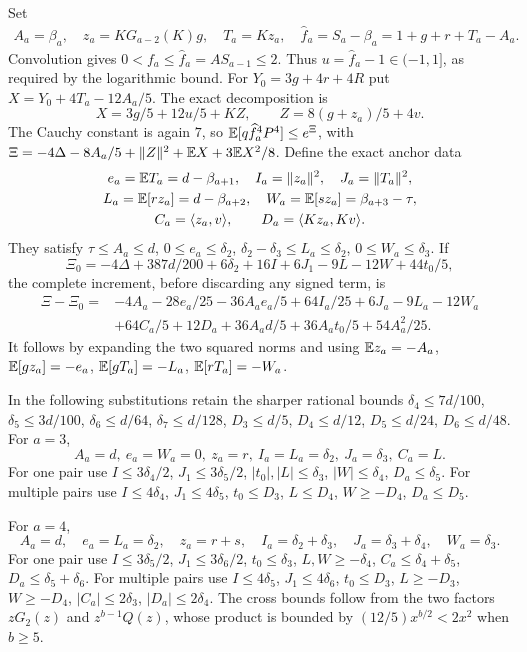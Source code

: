 Set
\begin{gather*}
 A_a=\beta_a,\quad z_a=KG_{a-2}(K)g,\quad T_a=Kz_a,\quad
 \widehat f_a=S_a-\beta_a=1+g+r+T_a-A_a.
\end{gather*}
Convolution gives $0<f_a\le\widehat f_a=AS_{a-1}\le2$.
Thus $u=\widehat f_a-1\in(-1,1]$, as required by the logarithmic bound.
For $Y_0=3g+4r+4R$ put $X=Y_0+4T_a-12A_a/5$.
The exact decomposition is
\[
 X=3g/5+12u/5+KZ,\qquad Z=8(g+z_a)/5+4v.
\]
The Cauchy constant is again $7$, so
$\mathbb E[q\widehat f_a^4P^4]\le e^\Xi$, with
$\Xi=-4\Delta-8A_a/5+\|Z\|^2+\mathbb E X+3\mathbb E X^2/8$.
Define the exact anchor data
\begin{gather*}
 e_a=\mathbb E T_a=d-\beta_{a+1},\quad I_a=\|z_a\|^2,\quad J_a=\|T_a\|^2,\\
 L_a=\mathbb E[rz_a]=d-\beta_{a+2},\quad
 W_a=\mathbb E[sz_a]=\beta_{a+3}-\tau,\\
 C_a=\langle z_a,v\rangle,\qquad D_a=\langle Kz_a,Kv\rangle.
\end{gather*}
They satisfy $\tau\le A_a\le d$, $0\le e_a\le \delta_{2}$,
$\delta_{2}-\delta_{3}\le L_a\le \delta_{2}$, $0\le W_a\le \delta_{3}$.
If
\[
 \Xi_0=-4\Delta+387d/200+6\delta_{2}+16I+6J_1-9L-12W+44t_0/5,
\]
the complete increment, before discarding any signed term, is
\begin{align*}
 \Xi-\Xi_0={}&-4A_a-28e_a/25-36A_ae_a/5+64I_a/25+6J_a-9L_a-12W_a\\
 &+64C_a/5+12D_a+36A_ad/5+36A_at_0/5+54A_a^2/25.
\end{align*}
It follows by expanding the two squared norms and using
$\mathbb E z_a=-A_a$, $\mathbb E[gz_a]=-e_a$,
$\mathbb E[gT_a]=-L_a$, $\mathbb E[rT_a]=-W_a$.

In the following substitutions retain the sharper rational bounds
$\delta_{4}\le7d/100$, $\delta_{5}\le3d/100$, $\delta_{6}\le d/64$, $\delta_{7}\le d/128$,
$D_3\le d/5$, $D_4\le d/12$, $D_5\le d/24$, $D_6\le d/48$.
For $a=3$,
\[
 A_a=d,\ e_a=W_a=0,\ z_a=r,\ I_a=L_a=\delta_{2},\ J_a=\delta_{3},\ C_a=L.
\]
For one pair use $I\le3\delta_{4}/2$, $J_1\le3\delta_{5}/2$,
$|t_0|,|L|\le \delta_{3}$, $|W|\le \delta_{4}$, $D_a\le \delta_{5}$.
For multiple pairs use $I\le4\delta_{4}$, $J_1\le4\delta_{5}$, $t_0\le D_3$,
$L\le D_4$, $W\ge-D_4$, $D_a\le D_5$.

For $a=4$,
\[
 A_a=d,\quad e_a=L_a=\delta_{2},\quad z_a=r+s,\quad
 I_a=\delta_{2}+\delta_{3},\quad J_a=\delta_{3}+\delta_{4},\quad W_a=\delta_{3}.
\]
For one pair use $I\le3\delta_{5}/2$, $J_1\le3\delta_{6}/2$,
$t_0\le \delta_{3}$, $L,W\ge-\delta_{4}$,
$C_a\le \delta_{4}+\delta_{5}$, $D_a\le \delta_{5}+\delta_{6}$.
For multiple pairs use $I\le4\delta_{5}$, $J_1\le4\delta_{6}$,
$t_0\le D_3$, $L\ge-D_3$, $W\ge-D_4$,
$|C_a|\le2\delta_{3}$, $|D_a|\le2\delta_{4}$.
The cross bounds follow from the two factors $zG_2(z)$ and
$z^{b-1}Q(z)$, whose product is bounded by
$(12/5)x^{b/2}<2x^2$ when $b\ge5$.


